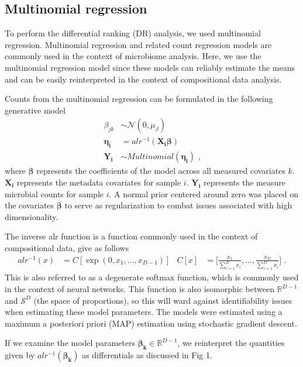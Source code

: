 \subsection{Multinomial regression}
To perform the differential ranking (DR) analysis, we used multinomial regression. Multinomial regression and related count regression models are commonly used in the context of microbiome analysis. Here, we use the multinomial regression model since these models can reliably estimate the means and can be easily reinterpreted in the context of compositional data analysis.

Counts from the multinomial regression can be formulated in the following generative model
\begin{align*}
  \beta_{jk} &\sim \mathcal{N}(0, \mu_{\beta})\\
  \boldsymbol{\eta_i} &= alr^{-1}(\boldsymbol{X_i} \boldsymbol{\beta})\\
  \boldsymbol{Y_i} &\sim Multinomial(\boldsymbol{\eta_i}) \mbox{ ,}
\end{align*}
where $\boldsymbol{\beta}$ represents the coefficients of the model across all measured covariates $k$. $\boldsymbol{X_i}$ represents the metadata covariates for sample $i$. $\boldsymbol{Y_i}$ represents the measure microbial counts for sample $i$. A normal prior centered around zero was placed on the covariates $\boldsymbol{\beta}$ to serve as regularization to combat issues associated with high dimensionality.

The inverse alr function is a function commonly used in the context of compositional data, give as follows
\begin{align*}
  alr^{-1}(x) &= C[\exp(0, x_1, \ldots, x_{D-1})] & C[x] &= \bigg[ \frac{x_1}{\sum\limits_{i=1}^D x_i}, \ldots, \frac{x_D}{\sum\limits_{i=1}^D x_i} \bigg] \mbox{ .}
\end{align*}
This is also referred to as a degenerate softmax function, which is commonly used in the context of neural networks.  This function is also isomorphic between $\mathbb{R}^{D-1}$ and $\mathcal{S}^D$ (the space of proportions), so this will ward against identifiability issues when estimating these model parameters. The models were estimated using a maximum a posteriori priori (MAP) estimation using stochastic gradient descent.

If we examine the model parameters $\boldsymbol{\beta_k} \in \mathbb{R}^{D-1}$, we reinterpret the quantities given by $alr^{-1}(\boldsymbol{\beta_{k}})$ as differentials as discussed in Fig 1.

